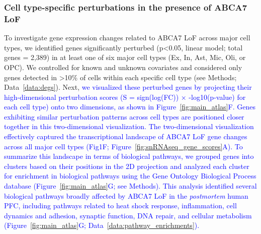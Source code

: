 \subsubsection{Cell type-specific perturbations in the presence of ABCA7 LoF}
To investigate gene expression changes related to ABCA7 LoF across major cell types, we identified genes significantly perturbed (p<0.05, linear model; total genes = 2,389) in at least one of six major cell types (Ex, In, Ast, Mic, Oli, or OPC). We controlled for known and unknown covariates and considered only genes detected in >10\% of cells within each specific cell type (see Methods; Data~\ref{data:degs}). Next, \newcommand{\quoteF}{\textcolor{blue}{we visualized these perturbed genes by projecting their high-dimensional perturbation scores (S = sign(log(FC)) × -log10(p-value) for each cell type) onto two dimensions, as shown in Figure~\ref{fig:main_atlas}F. Genes exhibiting similar perturbation patterns across cell types are positioned closer together in this two-dimensional visualization. \label{quoteF-label}}} 
\quoteF
\newcommand{\quoteG}{\textcolor{blue}{The two-dimensional visualization effectively captured the transcriptional landscape of ABCA7 LoF gene changes across all major cell types (Fig1F; Figure~\ref{fig:snRNAseq_gene_scores}A). To summarize this landscape in terms of biological pathways, we grouped genes into clusters based on their positions in the 2D projection and analyzed each cluster for enrichment in biological pathways using the Gene Ontology Biological Process database (Figure~\ref{fig:main_atlas}G; see Methods). This analysis identified several biological pathways broadly affected by ABCA7 LoF in the \textit{postmortem} human PFC, including pathways related to heat shock response, inflammation, cell dynamics and adhesion, synaptic function, DNA repair, and cellular metabolism (Figure~\ref{fig:main_atlas}G; Data~\ref{data:pathway_enrichments}). \label{quoteG-label}}} 
\quoteG


